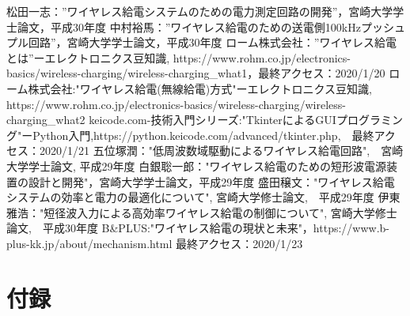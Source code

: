 \documentclass[12pt]{jarticle}
\begin{document}
\begin{thebibliography}{50}
	松田一志：”ワイヤレス給電システムのための電力測定回路の開発”，宮崎大学学士論文，平成30年度
	中村裕馬：”ワイヤレス給電のための送電側100kHzプッシュプル回路”，宮崎大学学士論文，平成30年度
	ローム株式会社：”ワイヤレス給電とは”ーエレクトロニクス豆知識, https://www.rohm.co.jp/electronics-basics/wireless-charging/wireless-charging\_what1，最終アクセス：2020/1/20
	ローム株式会社:"ワイヤレス給電(無線給電)方式"ーエレクトロニクス豆知識, https://www.rohm.co.jp/electronics-basics/wireless-charging/wireless-charging\_what2
	keicode.com-技術入門シリーズ:"TkinterによるGUIプログラミング"ーPython入門,https://python.keicode.com/advanced/tkinter.php,　最終アクセス：2020/1/21
	五位塚潤："低周波数域駆動によるワイヤレス給電回路",　宮崎大学学士論文, 平成29年度
	白銀聡一郎："ワイヤレス給電のための短形波電源装置の設計と開発"，宮崎大学学士論文，平成29年度
	盛田穣文："ワイヤレス給電システムの効率と電力の最適化について", 宮崎大学修士論文,　平成29年度
	伊東雅浩："短径波入力による高効率ワイヤレス給電の制御について", 宮崎大学修士論文,　平成30年度
	B\&PLUS:"ワイヤレス給電の現状と未来"，https://www.b-plus-kk.jp/about/mechanism.html 最終アクセス：2020/1/23
\end{thebibliography}
\clearpage
\section{付録}
\end{document}
